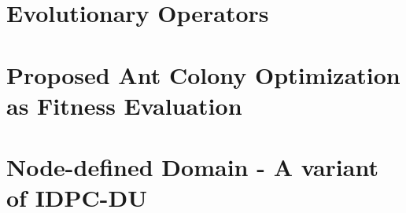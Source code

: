\section{Evolutionary Operators}
\label{proposed:operator}


\section{Proposed Ant Colony Optimization as Fitness Evaluation}
\label{proposed:aco}


\section{Node-defined Domain - A variant of IDPC-DU}
\label{proposed:ndu}
